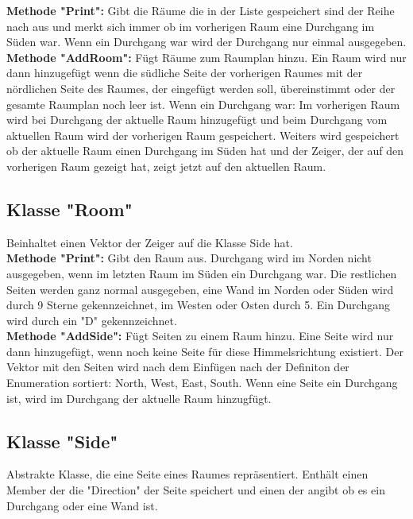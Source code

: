\documentclass[12pt,a4paper]{article}
\begin{document}
\textbf {Methode "Print": } 
Gibt die Räume die in der Liste gespeichert sind der Reihe nach aus und merkt sich immer ob im vorherigen Raum eine Durchgang im Süden war. Wenn ein Durchgang war wird der Durchgang nur einmal ausgegeben. \\

\textbf {Methode "AddRoom":}
Fügt Räume zum Raumplan hinzu. Ein Raum wird nur dann hinzugefügt wenn die südliche Seite der vorherigen Raumes mit der nördlichen Seite des Raumes, der eingefügt werden soll, übereinstimmt oder der gesamte Raumplan noch leer ist. Wenn ein Durchgang war: Im vorherigen Raum wird bei Durchgang der aktuelle Raum hinzugefügt und beim Durchgang vom aktuellen Raum wird der vorherigen Raum gespeichert.
Weiters wird gespeichert ob der aktuelle Raum einen Durchgang im Süden hat und der Zeiger, der auf den vorherigen Raum gezeigt hat, zeigt jetzt auf den aktuellen Raum. \\

\subsection {Klasse "Room"}
Beinhaltet einen Vektor der Zeiger auf die Klasse Side hat.\\

\textbf {Methode "Print":} 
Gibt den Raum aus. Durchgang wird im Norden nicht ausgegeben, wenn im letzten Raum im Süden ein Durchgang war. Die restlichen Seiten werden ganz normal ausgegeben, eine Wand im Norden oder Süden wird durch 9 Sterne gekennzeichnet, im Westen oder Osten durch 5. Ein Durchgang wird durch ein "D" gekennzeichnet. \\

\textbf {Methode "AddSide":}
Fügt Seiten zu einem Raum hinzu. Eine Seite wird nur dann hinzugefügt, wenn noch keine Seite für diese Himmelsrichtung existiert. Der Vektor mit den Seiten wird nach dem Einfügen nach der Definiton der Enumeration sortiert: North, West, East, South. Wenn eine Seite ein Durchgang ist, wird im Durchgang der aktuelle Raum hinzugfügt. \\

\subsection {Klasse "Side"} 
Abstrakte Klasse, die eine Seite eines Raumes repräsentiert. Enthält einen Member der die "Direction" der Seite speichert und einen der angibt ob es ein Durchgang oder eine Wand ist. \\
\end{document}
